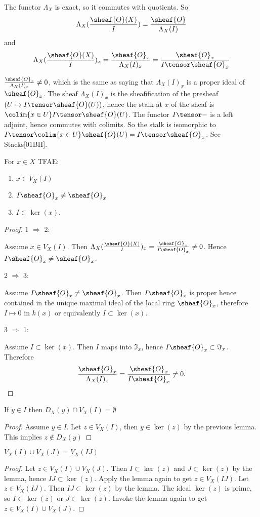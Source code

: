 The functor $\Lambda_X$ is exact, so it commutes with quotients.
So
\[\Lambda_X(\frac{\sheaf{O}(X)}{I}) = \frac{\sheaf{O}}{\Lambda_X(I)}\]
and 
\[\Lambda_X(\frac{\sheaf{O}(X)}{I})_x = \frac{\sheaf{O}_x}{\Lambda_X(I)_x} = \frac{\sheaf{O}_x}{I\tensor \sheaf{O}_x} \]

$\frac{\sheaf{O}_x}{\Lambda_X(I)_x} \neq 0$, which is the same as saying that  $\Lambda_X(I)_x$ is a proper ideal of $\sheaf{O}_x$. 
The sheaf $\Lambda_X(I)_x$ is the sheafification of the presheaf $(U \mapsto I \tensor \sheaf{O}(U))$, hence the stalk at $x$ of the sheaf is 
$\colim{x \in U} I\tensor \sheaf{O}(U)$. The functor $I\tensor -$ is a left adjoint, hence commutes with colimits.
So the stalk is isomorphic to $I\tensor \colim{x\in U} \sheaf{O}(U)= I\tensor \sheaf{O}_x$. See Stacks[01BH]. 

\begin{lemma}
For $x\in X$ TFAE:
\begin{enumerate}
\item $x\in V_X(I)$
\item $I\sheaf{O}_x\neq \sheaf{O}_x$ 
\item $I\subset \ker(x)$.
\end{enumerate}
\end{lemma}
\begin{proof}
1 $\Rightarrow$ 2:

Assume $x\in V_X(I)$. 
Then $\Lambda_X(\frac{\sheaf{O}(X)}{I})_x = \frac{\sheaf{O}_x}{I\sheaf{O}_x} \neq 0$. 
Hence $I\sheaf{O}_x \neq \sheaf{O}_x$.

2 $\Rightarrow$ 3: 

Assume $I\sheaf{O}_x\neq \sheaf{O}_x$. 
Then $I\sheaf{O}_x$ is proper hence contained in the unique maximal ideal of the local ring $\sheaf{O}_x$, 
therefore $I\mapsto 0$ in $k(x)$ or equivalently $I\subset \ker(x)$.

3 $\Rightarrow$ 1:

Assume $I \subset \ker(x)$. Then $I$ maps into $\Im_x$, hence $I\sheaf{O}_x \subset \Im_x$. Therefore 
\[\frac{\sheaf{O}_x}{\Lambda_X(I)_x} = \frac{\sheaf{O}_x}{I\sheaf{O}_x} \neq 0.\]

\end{proof}
\begin{corollary}
If $y\in I$ then $D_X(y)\cap V_X(I)= \emptyset$ 
\end{corollary} 
\begin{proof}
Assume $y\in I$.
Let $z\in V_X(I)$, then $y\in \ker(z)$ by the previous lemma.
This implies $z\not\in D_X(y)$
\end{proof}
\begin{corollary}
$V_X(I)\cup V_X(J) = V_X(IJ)$
\end{corollary}
\begin{proof}
Let $z\in V_X(I)\cup V_X(J)$. Then $I\subset \ker(z)$ and $J\subset \ker(z)$ by the lemma, hence $IJ\subset \ker(z)$.
Apply the lemma again to get $z\in V_X(IJ)$.
Let $z\in V_X(IJ)$. Then $IJ \subset \ker(z)$ by the lemma. The ideal $\ker(z)$ is prime, so $I\subset \ker(z)$ or $J\subset \ker(z)$. Invoke the lemma again to get $z\in V_X(I)\cup V_X(J)$.
\end{proof}



